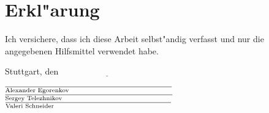 \section{Erkl"arung}
\label{sec:Erkl"arung}

\vspace{100pt}

Ich versichere, dass ich diese Arbeit selbst"andig verfasst und nur die
angegebenen Hilfsmittel verwendet habe.

\vspace{50pt}

\noindent
Stuttgart, den $\underline{\hspace{128pt}}$

\vspace{50pt}

\noindent
$\overline{\mbox{\scriptsize{Alexander Egorenkov}\hspace{120pt}}}$\\

\noindent
$\overline{\mbox{\scriptsize{Sergey Telezhnikov}\hspace{129pt}}}$\\

\noindent
$\overline{\mbox{\scriptsize{Valeri Schneider}\hspace{137pt}}}$
